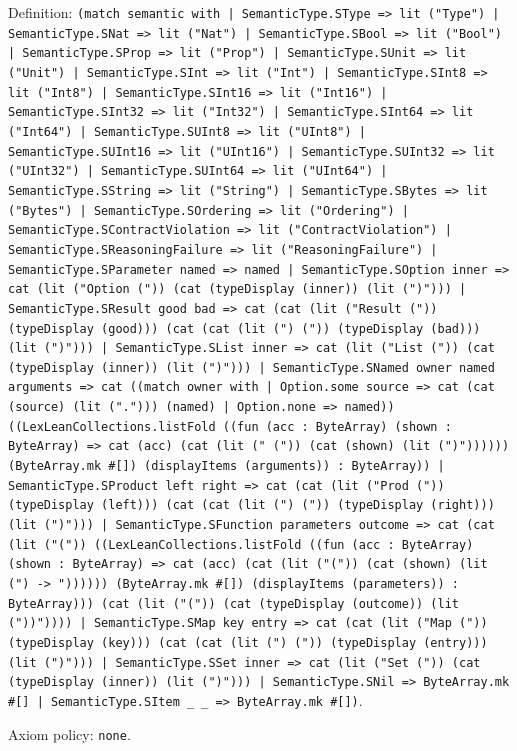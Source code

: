 \documentclass[11pt]{article}
\begin{document}
\noindent Definition: \texttt{(match semantic with | SemanticType.SType => lit ("Type") | SemanticType.SNat => lit ("Nat") | SemanticType.SBool => lit ("Bool") | SemanticType.SProp => lit ("Prop") | SemanticType.SUnit => lit ("Unit") | SemanticType.SInt => lit ("Int") | SemanticType.SInt8 => lit ("Int8") | SemanticType.SInt16 => lit ("Int16") | SemanticType.SInt32 => lit ("Int32") | SemanticType.SInt64 => lit ("Int64") | SemanticType.SUInt8 => lit ("UInt8") | SemanticType.SUInt16 => lit ("UInt16") | SemanticType.SUInt32 => lit ("UInt32") | SemanticType.SUInt64 => lit ("UInt64") | SemanticType.SString => lit ("String") | SemanticType.SBytes => lit ("Bytes") | SemanticType.SOrdering => lit ("Ordering") | SemanticType.SContractViolation => lit ("ContractViolation") | SemanticType.SReasoningFailure => lit ("ReasoningFailure") | SemanticType.SParameter named => named | SemanticType.SOption inner => cat (lit ("Option (")) (cat (typeDisplay (inner)) (lit (")"))) | SemanticType.SResult good bad => cat (cat (lit ("Result (")) (typeDisplay (good))) (cat (cat (lit (") (")) (typeDisplay (bad))) (lit (")"))) | SemanticType.SList inner => cat (lit ("List (")) (cat (typeDisplay (inner)) (lit (")"))) | SemanticType.SNamed owner named arguments => cat ((match owner with | Option.some source => cat (cat (source) (lit ("."))) (named) | Option.none => named)) ((LexLeanCollections.listFold ((fun (acc : ByteArray) (shown : ByteArray) => cat (acc) (cat (lit (" (")) (cat (shown) (lit (")")))))) (ByteArray.mk \#[]) (displayItems (arguments)) : ByteArray)) | SemanticType.SProduct left right => cat (cat (lit ("Prod (")) (typeDisplay (left))) (cat (cat (lit (") (")) (typeDisplay (right))) (lit (")"))) | SemanticType.SFunction parameters outcome => cat (cat (lit ("(")) ((LexLeanCollections.listFold ((fun (acc : ByteArray) (shown : ByteArray) => cat (acc) (cat (lit ("(")) (cat (shown) (lit (") -> ")))))) (ByteArray.mk \#[]) (displayItems (parameters)) : ByteArray))) (cat (lit ("(")) (cat (typeDisplay (outcome)) (lit ("))")))) | SemanticType.SMap key entry => cat (cat (lit ("Map (")) (typeDisplay (key))) (cat (cat (lit (") (")) (typeDisplay (entry))) (lit (")"))) | SemanticType.SSet inner => cat (lit ("Set (")) (cat (typeDisplay (inner)) (lit (")"))) | SemanticType.SNil => ByteArray.mk \#[] | SemanticType.SItem \_ \_ => ByteArray.mk \#[])}.\par
\noindent Axiom policy: \texttt{none}.\par
\end{document}
